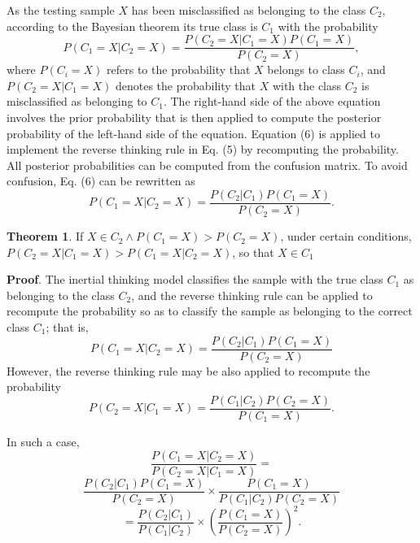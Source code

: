 As the testing sample $X$ has been misclassified as belonging to the class $C_2$, according to the Bayesian theorem its true class is $C_1$ with the probability
\begin{equation}
    P(C_1=X|C_2=X)=\frac{P(C_2=X|C_1=X)P(C_1=X)}{P(C_2=X)},
\end{equation}
where $P(C_i=X)$ refers to the probability that $X$ belongs to class $C_i$, and $P(C_2=X|C_1=X)$ denotes the probability that $X$ with the class $C_2$ is misclassified as belonging to $C_1$. The right-hand side of the above equation involves the prior probability that is then applied to compute the  posterior probability of the left-hand side of the equation. Equation (6) is applied to implement the reverse thinking rule in Eq. (5) by recomputing the probability. All posterior probabilities can be computed from the confusion matrix. To avoid confusion, Eq. (6) can be rewritten as
\begin{equation}
    P(C_1=X|C_2=X)=\frac{P(C_2|C_1)P(C_1=X)}{P(C_2=X)}.
\end{equation}

\textbf{Theorem 1}. If $X\in C_2\wedge P(C_1=X) > P(C_2=X)$, under certain conditions, $P(C_2=X|C_1=X)>P(C_1=X|C_2=X)$, so that $X\in C_1$

\textbf{Proof}. The inertial thinking model classifies the sample with the true class $C_1$ as belonging to the class $C_2$, and the reverse thinking rule can be applied to recompute the probability so as to classify the sample as belonging to the correct class $C_1$; that is,
\begin{displaymath}
    P(C_1=X|C_2=X)=\frac{P(C_2|C_1)P(C_1=X)}{P(C_2=X)}
\end{displaymath}
However, the reverse thinking rule may be also applied to recompute the probability
\begin{displaymath}
    P(C_2=X|C_1=X)=\frac{P(C_1|C_2)P(C_2=X)}{P(C_1=X)}.
\end{displaymath}

In such a case,
\begin{displaymath}
    \frac{P(C_1=X|C_2=X)}{P(C_2=X|C_1=X)}=
\end{displaymath}
\begin{displaymath}
    \frac{P(C_2|C_1)P(C_1=X)}{P(C_2=X)}\times \frac{P(C_1=X)}{P(C_1|C_2)P(C_2=X)}
\end{displaymath}
\begin{displaymath}
   =\frac{P(C_2|C_1)}{P(C_1|C_2)}\times (\frac{P(C_1=X)}{P(C_2=X)})^2.
\end{displaymath}

